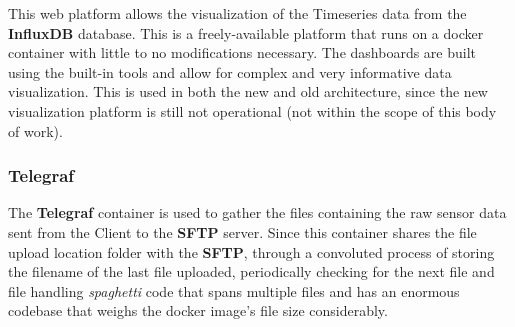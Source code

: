 This web platform allows the visualization of the Timeseries data from the \textbf{InfluxDB} database. This is a freely-available platform that runs on a docker container with little to no modifications necessary. The dashboards are built using the built-in tools and allow for complex and very informative data visualization. This is used in both the new and old architecture, since the new visualization platform is still not operational (not within the scope of this body of work).

\subsubsection{Telegraf}
\label{methodology:sss:telegraf}

The \textbf{Telegraf} container is used to gather the files containing the raw sensor data sent from the Client to the \textbf{SFTP} server. Since this container shares the file upload location folder with the \textbf{SFTP}, through a convoluted process of storing the filename of the last file uploaded, periodically checking for the next file and file handling \textit{spaghetti} code that spans multiple files and has an enormous codebase that weighs the docker image's file size considerably. 
